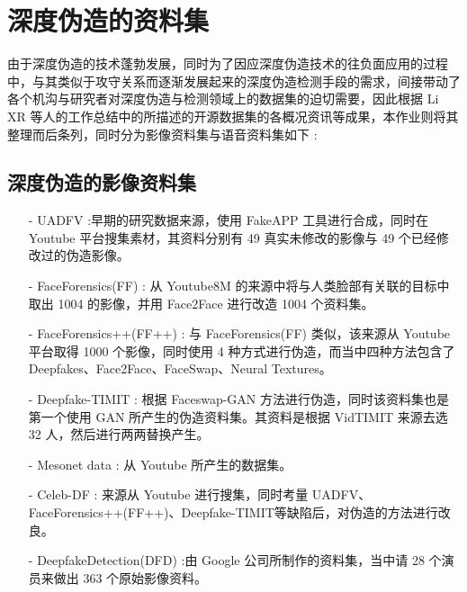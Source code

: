 \chapter{深度伪造的资料集}
\label{chap:2}

由于深度伪造的技术蓬勃发展，同时为了因应深度伪造技术的往负面应用的过程中，与其类似于攻守关系而逐渐发展起来的深度伪造检测手段的需求，间接带动了各个机沟与研究者对深度伪造与检测领域上的数据集的迫切需要，因此根据 Li XR 等人的工作总结中的所描述的开源数据集的各概况资讯等成果，本作业则将其整理而后条列，同时分为影像资料集与语音资料集如下 :

\section{深度伪造的影像资料集}

\begin{itemize}
\item [-] UADFV \cite{matern2019exploiting}:早期的研究数据来源，使用 FakeAPP \cite{list1141} 工具进行合成，同时在 Youtube 平台搜集素材，其资料分别有 49 真实未修改的影像与 49 个已经修改过的伪造影像。

\item [-] FaceForensics(FF) \cite{rossler2018faceforensics}: 从 Youtube8M \cite{abu2016youtube} 的来源中将与人类脸部有关联的目标中取出 1004 的影像，并用 Face2Face 进行改造 1004 个资料集。

\item [-] FaceForensics++(FF++) \cite{rossler2019faceforensics++}: 与 FaceForensics(FF) 类似，该来源从 Youtube 平台取得 1000 个影像，同时使用 4 种方式进行伪造，而当中四种方法包含了 Deepfakes、Face2Face、FaceSwap、Neural Textures。

\item [-] Deepfake-TIMIT \cite{korshunov2018deepfakes}: 根据 Faceswap-GAN 方法进行伪造，同时该资料集也是第一个使用 GAN 所产生的伪造资料集。其资料是根据 VidTIMIT 来源去选 32 人，然后进行两两替换产生。

\item [-]Mesonet data \cite{afchar2018mesonet}: 从 Youtube 所产生的数据集。

\item [-]Celeb-DF \cite{li2019celeb}: 来源从 Youtube 进行搜集，同时考量 UADFV、FaceForensics++(FF++)、Deepfake-TIMIT等缺陷后，对伪造的方法进行改良。

\item [-] DeepfakeDetection(DFD) \cite{list1067}:由 Google 公司所制作的资料集，当中请 28 个演员来做出 363 个原始影像资料。


\end{itemize}
